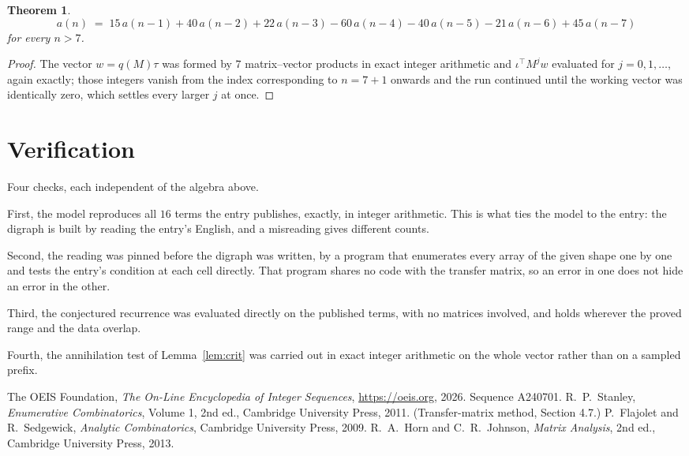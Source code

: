 \documentclass[11pt,a4paper]{article}
\theoremstyle{plain}
\newtheorem{theorem}{Theorem}
\theoremstyle{definition}
\begin{document}
\begin{theorem}
\[
a(n)\;=\;15\,a(n-1) + 40\,a(n-2) + 22\,a(n-3) - 60\,a(n-4) - 40\,a(n-5) - 21\,a(n-6) + 45\,a(n-7)
\]
for every $n>7$.
\end{theorem}

\begin{proof}
The vector $w=q(M)\tau$ was formed by $7$ matrix--vector products in exact integer
arithmetic and $\iota^{\!\top}M^{j}w$ evaluated for $j=0,1,\dots$, again exactly; those
integers vanish from the index corresponding to $n=7+1$ onwards and the run continued
until the working vector was identically zero, which settles every larger $j$ at once.
\end{proof}

\section{Verification}

Four checks, each independent of the algebra above.

First, the model reproduces all $16$ terms the entry publishes, exactly, in integer
arithmetic. This is what ties the model to the entry: the digraph is built by reading the
entry's English, and a misreading gives different counts.

Second, the reading was pinned before the digraph was written, by a program that enumerates
every array of the given shape one by one and tests the entry's condition at each cell
directly. That program shares no code with the transfer matrix, so an error in one does not
hide an error in the other.

Third, the conjectured recurrence was evaluated directly on the published terms, with no
matrices involved, and holds wherever the proved range and the data overlap.

Fourth, the annihilation test of Lemma~\ref{lem:crit} was carried out in exact integer
arithmetic on the whole vector rather than on a sampled prefix.

\begin{thebibliography}{9}
 The OEIS Foundation, \emph{The On-Line Encyclopedia of Integer
Sequences}, \url{https://oeis.org}, 2026. Sequence A240701.
 R.~P.~Stanley, \emph{Enumerative Combinatorics}, Volume 1, 2nd ed.,
Cambridge University Press, 2011. (Transfer-matrix method, Section 4.7.)
 P.~Flajolet and R.~Sedgewick, \emph{Analytic Combinatorics}, Cambridge
University Press, 2009.
 R.~A.~Horn and C.~R.~Johnson, \emph{Matrix Analysis}, 2nd ed., Cambridge
University Press, 2013.
\end{thebibliography}
\end{document}
